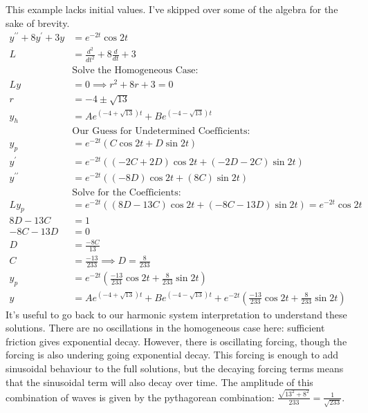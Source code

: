 \documentclass[fleqn,letterpaper]{report}
\begin{document}
\begin{example}
This example lacks initial values. I've skipped
over some of the algebra for the sake of brevity.
\begin{align*}
y^{\prime \prime} + 8 y^\prime + 3y & = e^{-2t} \cos 2t \\
L & = \frac{d^2}{dt^2} + 8 \frac{d}{dt} + 3 \\
& \text{Solve the Homogeneous Case:} \\
Ly & = 0 \implies r^2 + 8r + 3 = 0 \\
r & = -4 \pm \sqrt{13} \\
y_h & = Ae^{(-4+\sqrt{13})t} + B e^{(-4-\sqrt{13})t} \\
& \text{Our Guess for Undetermined Coefficients:} \\
y_p & = e^{-2t} (C \cos 2t + D \sin 2t) \\
y^\prime & = e^{-2t} ( (-2C + 2D) \cos 2t + (-2D -2C)\sin 2t) \\
y^{\prime\prime} & = e^{-2t} ( (-8D) \cos 2t + (8C)\sin 2t) \\
& \text{Solve for the Coefficients:} \\
L y_p & = e^{-2t} ((8D-13C) \cos 2t + (-8C -13D) \sin 2t) =
e^{-2t} \cos 2t \\
8D - 13 C & = 1 \\
-8C - 13 D & = 0 \\
D & = \frac{-8C}{13} \\
C & = \frac{-13}{233} \implies D = \frac{8}{233} \\
y_p & = e^{-2t} \left( \frac{-13}{233} \cos 2t + \frac{8}{233}
\sin 2t \right) \\
y & = Ae^{(-4+\sqrt{13})t} + B e^{(-4-\sqrt{13})t} + e^{-2t}
\left( \frac{-13}{233} \cos 2t + \frac{8}{233} \sin 2t \right)
\end{align*}
It's useful to go back to our harmonic system interpretation
to understand these solutions. There are no oscillations in
the homogeneous case here: sufficient friction gives 
exponential decay. However, there is oscillating forcing,
though the forcing is also undering going exponential decay.
This forcing is enough to add sinusoidal behaviour to the full
solutions, but the decaying forcing terms means that the
sinusoidal term will also decay over time. The amplitude of
this combination of waves is given by the pythagorean
combination: $\frac{\sqrt{13^2 + 8^2}}{233} =
\frac{1}{\sqrt{233}}$. 
\end{example}
\end{document}
